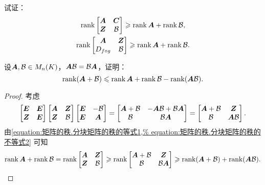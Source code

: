 \begin{example}
试证：\begin{gather}
	\rank\begin{bmatrix} \A & \C \\ \z & \B \end{bmatrix} \geqslant \rank\A + \rank\B,
	\label{equation:矩阵的秩.分块矩阵的秩的不等式1} \\
	\rank\begin{bmatrix} \A & \z \\ \D & \B \end{bmatrix} \geqslant \rank\A + \rank\B.
	\label{equation:矩阵的秩.分块矩阵的秩的不等式2}
\end{gather}
\end{example}

\begin{example}
设\(\A,\B\in M_n(K)\)，\(\A\B=\B\A\)，证明：\[
	\rank(\A+\B)\leqslant\rank\A+\rank\B-\rank(\A\B).
\]
\begin{proof}
考虑\[
	\begin{bmatrix}
		\E & \E \\
		\z & \E
	\end{bmatrix}
	\begin{bmatrix}
		\A & \z \\
		\z & \B
	\end{bmatrix}
	\begin{bmatrix}
		\E & -\B \\
		\E & \A
	\end{bmatrix}
	= \begin{bmatrix}
		\A+\B & -\A\B+\B\A \\
		\B & \B\A
	\end{bmatrix}
	= \begin{bmatrix}
		\A+\B & \z \\
		\B & \A\B
	\end{bmatrix}.
\]
由\cref{equation:矩阵的秩.分块矩阵的秩的等式1,%
equation:矩阵的秩.分块矩阵的秩的不等式2} 可知\[
	\rank\A+\rank\B
	= \rank\begin{bmatrix}
		\A & \z \\
		\z & \B
	\end{bmatrix}
	\geqslant \rank\begin{bmatrix}
		\A+\B & \z \\
		\B & \B\A
	\end{bmatrix}
	\geqslant \rank(\A+\B) + \rank(\A\B).
	\qedhere
\]
\end{proof}
\end{example}

